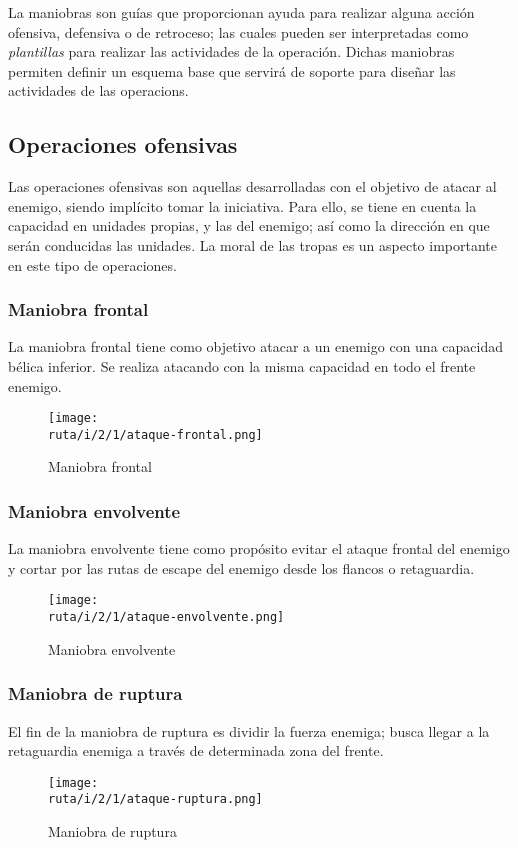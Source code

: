 La maniobras son guías que proporcionan ayuda para realizar alguna acción ofensiva, defensiva o de retroceso; las cuales pueden ser interpretadas como \emph{plantillas} para realizar las actividades de la operación. Dichas maniobras permiten definir un esquema base que servirá de soporte para diseñar las actividades de las \glspl{operacion}.



\subsection{Operaciones ofensivas}
Las operaciones ofensivas son aquellas desarrolladas con el objetivo de atacar al enemigo, siendo implícito tomar la iniciativa. Para ello, se tiene en cuenta la capacidad en unidades propias, y las del enemigo; así como la dirección en que serán conducidas las unidades. La moral de las tropas es un aspecto importante en este tipo de operaciones.

\subsubsection{Maniobra frontal}
La maniobra frontal tiene como objetivo atacar a un enemigo con una capacidad bélica inferior. Se realiza atacando con la misma capacidad en todo el \gls{frente} enemigo.
\begin{figure}[H]
 \centering
 \texttt{[image: \\ruta/i/2/1/ataque-frontal.png]}
 \caption{Maniobra frontal}
 \label{2-1:fig:ataque-frontal}
\end{figure}

\subsubsection{Maniobra envolvente}
La maniobra envolvente tiene como propósito evitar el ataque frontal del enemigo y cortar por las rutas de escape del enemigo desde los flancos o retaguardia.
\begin{figure}[H]
 \centering
 \texttt{[image: \\ruta/i/2/1/ataque-envolvente.png]}
 \caption{Maniobra envolvente}
 \label{2-1:fig:ataque-envolvente}
\end{figure}


\subsubsection{Maniobra de ruptura}
El fin de la maniobra de ruptura es dividir la fuerza enemiga; busca llegar a la retaguardia enemiga a través de determinada zona del \gls{frente}.
\begin{figure}[H]
 \centering
 \texttt{[image: \\ruta/i/2/1/ataque-ruptura.png]}
 \caption{Maniobra de ruptura}
 \label{2-1:fig:ataque-ruptura}
\end{figure}


